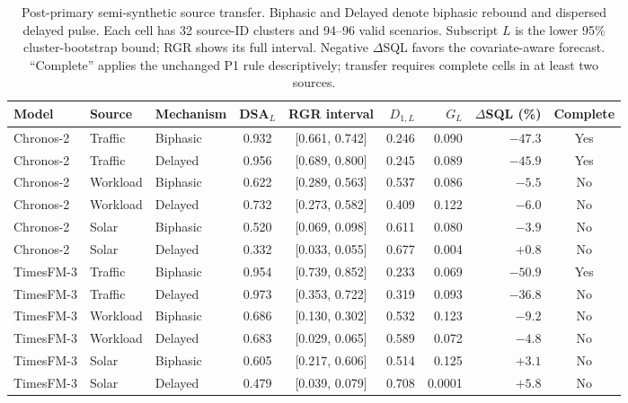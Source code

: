 \begin{table}[t]
\caption{Post-primary semi-synthetic source transfer. Biphasic and Delayed denote biphasic rebound and dispersed delayed pulse. Each cell has 32 source-ID clusters and 94--96 valid scenarios. Subscript $L$ is the lower 95\% cluster-bootstrap bound; RGR shows its full interval. Negative $\Delta$SQL favors the covariate-aware forecast. ``Complete'' applies the unchanged P1 rule descriptively; transfer requires complete cells in at least two sources.}
\label{tab:p3-v2-transfer}
\centering
\small
\setlength{\tabcolsep}{4.5pt}
\begin{tabular}{lllccrrrc}
\toprule
Model & Source & Mechanism & DSA$_L$ & RGR interval & $D_{1,L}$ & $G_L$ & $\Delta$SQL (\%) & Complete \\
\midrule
Chronos-2 & Traffic & Biphasic & 0.932 & [0.661, 0.742] & 0.246 & 0.090 & $-47.3$ & Yes \\
Chronos-2 & Traffic & Delayed & 0.956 & [0.689, 0.800] & 0.245 & 0.089 & $-45.9$ & Yes \\
Chronos-2 & Workload & Biphasic & 0.622 & [0.289, 0.563] & 0.537 & 0.086 & $-5.5$ & No \\
Chronos-2 & Workload & Delayed & 0.732 & [0.273, 0.582] & 0.409 & 0.122 & $-6.0$ & No \\
Chronos-2 & Solar & Biphasic & 0.520 & [0.069, 0.098] & 0.611 & 0.080 & $-3.9$ & No \\
Chronos-2 & Solar & Delayed & 0.332 & [0.033, 0.055] & 0.677 & 0.004 & $+0.8$ & No \\
\midrule
TimesFM-3 & Traffic & Biphasic & 0.954 & [0.739, 0.852] & 0.233 & 0.069 & $-50.9$ & Yes \\
TimesFM-3 & Traffic & Delayed & 0.973 & [0.353, 0.722] & 0.319 & 0.093 & $-36.8$ & No \\
TimesFM-3 & Workload & Biphasic & 0.686 & [0.130, 0.302] & 0.532 & 0.123 & $-9.2$ & No \\
TimesFM-3 & Workload & Delayed & 0.683 & [0.029, 0.065] & 0.589 & 0.072 & $-4.8$ & No \\
TimesFM-3 & Solar & Biphasic & 0.605 & [0.217, 0.606] & 0.514 & 0.125 & $+3.1$ & No \\
TimesFM-3 & Solar & Delayed & 0.479 & [0.039, 0.079] & 0.708 & 0.0001 & $+5.8$ & No \\
\bottomrule
\end{tabular}
\end{table}
